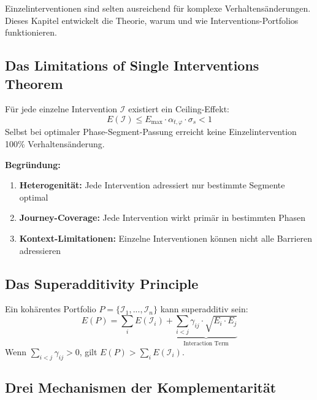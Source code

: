 Einzelinterventionen sind selten ausreichend für komplexe Verhaltensänderungen. Dieses Kapitel entwickelt die Theorie, warum und wie Interventions-Portfolios funktionieren.

\subsection{Das Limitations of Single Interventions Theorem}

\begin{theorem}
\label{thm:20-ceiling}
Für jede einzelne Intervention $\mathcal{I}$ existiert ein Ceiling-Effekt:
\begin{equation}
E(\mathcal{I}) \leq E_{\max} \cdot \alpha_{t,\varphi} \cdot \sigma_s < 1
\label{eq:20-ceiling}
\end{equation}
Selbst bei optimaler Phase-Segment-Passung erreicht keine Einzelintervention 100\% Verhaltensänderung.
\end{theorem}

\textbf{Begründung:}
\begin{enumerate}
\item \textbf{Heterogenität:} Jede Intervention adressiert nur bestimmte Segmente optimal
\item \textbf{Journey-Coverage:} Jede Intervention wirkt primär in bestimmten Phasen
\item \textbf{Kontext-Limitationen:} Einzelne Interventionen können nicht alle Barrieren adressieren
\end{enumerate}

\subsection{Das Superadditivity Principle}

\begin{tcolorbox}[colback=blue!5!white, colframe=blue!75!black,
    title=Axiom HHH-A4: Portfolio Complementarity]
Ein kohärentes Portfolio $P = \{\mathcal{I}_1, ..., \mathcal{I}_n\}$ kann superadditiv sein:
\begin{equation}
E(P) = \sum_{i} E(\mathcal{I}_i) + \underbrace{\sum_{i < j} \gamma_{ij} \cdot \sqrt{E_i \cdot E_j}}_{\text{Interaction Term}}
\label{eq:20-superadditivity}
\end{equation}
Wenn $\sum_{i<j} \gamma_{ij} > 0$, gilt $E(P) > \sum_i E(\mathcal{I}_i)$.
\end{tcolorbox}

\subsection{Drei Mechanismen der Komplementarität}

